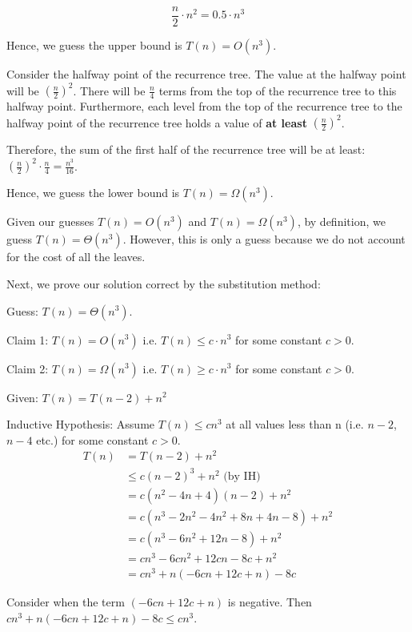 \documentclass[a4paper]{report}
\begin{document}
\begin{enumerate}
      $$\frac{n}{2} \cdot n^2 = 0.5 \cdot n^3$$

      Hence, we guess the upper bound is $T(n) = O(n^3)$. 

      Consider the halfway point of the recurrence tree. The value at the halfway point will be $(\frac{n}{2})^2$. There will be
      $\frac{n}{4}$ terms from the top of the recurrence tree to this halfway point. Furthermore, each level from the top of the
      recurrence tree to the halfway point of the recurrence tree holds a value of {\bf at least} $(\frac{n}{2})^2$.

      Therefore, the sum of the first half of the recurrence tree will be at least: $(\frac{n}{2})^2 \cdot \frac{n}{4} = \frac{n^{3}}{16}$.

      Hence, we guess the lower bound is $T(n) = \Omega(n^3)$.

      Given our guesses $T(n) = O(n^3)$ and $T(n) = \Omega(n^3)$, by definition, we guess $T(n) = \Theta(n^3)$.
      However, this is only a guess because we do not account for the cost of all the leaves. 
    

  
      Next, we prove our solution correct by the substitution method:

      Guess: $T(n) = \Theta(n^3)$.

      Claim 1: $T(n) = O(n^3)$ i.e. $T(n) \leq c \cdot n^3$ for some constant $c>0$.

      Claim 2: $T(n) = \Omega(n^3)$ i.e. $T(n) \geq c \cdot n^3$ for some constant $c>0$.

      Given: $T(n) = T(n-2) + n^2$

      Inductive Hypothesis: Assume $T(n) \leq cn^3$ at all values less than n (i.e. $n-2$, $n-4$ etc.) for some constant $c>0$.
      \begin{align}
        T(n) &= T(n-2) + n^2  \\
        &\leq c(n-2)^3 + n^2  \text{         (by IH)}\\
        &= c(n^2 - 4n + 4)(n-2) + n^2 \\
        &= c(n^3 - 2n^2 - 4n^2 + 8n + 4n - 8) + n^2 \\
        &= c(n^3 - 6n^2 + 12n - 8) + n^2  \\
        &= cn^3 - 6cn^2 + 12cn - 8c + n^2  \\
        &= cn^3 + n(-6cn + 12c + n) - 8c   
      \end{align}

      Consider when the term $(-6cn + 12c + n)$ is negative. Then
      $cn^3 + n(-6cn + 12c + n) - 8c \leq cn^3$.


\end{enumerate}
\end{document}
